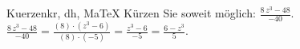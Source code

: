 \begin{MAufgabe}{Kuerzen}{kr, dh, MaTeX}
K\"urzen Sie soweit m\"oglich: $\frac{8\, z^3 - 48}{-40}$.\\ 
\ifLsg\MLoesung
\quad $\frac{8\, z^3 - 48}{-40}=\frac{(8)\cdot(z^3 - 6)}{(8)\cdot(-5)}=\frac{z^3 - 6}{-5}=\frac{6 - z^3}{5}$.\else\relax\fi
 \end{MAufgabe}
